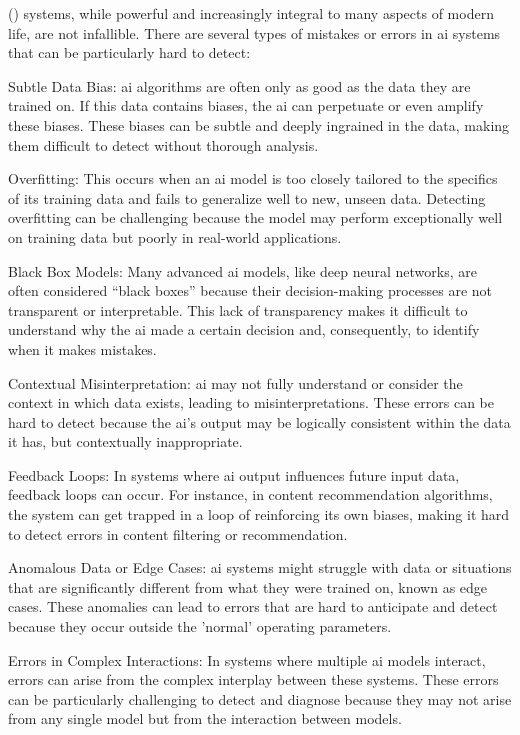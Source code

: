 \begin{aibox}
 () systems, while powerful and increasingly integral to many aspects of modern life, are not infallible. There are several types of mistakes or errors in \gls{ai} systems that can be particularly hard to detect:

Subtle Data Bias: \gls{ai} algorithms are often only as good as the data they are trained on. If this data contains biases, the \gls{ai} can perpetuate or even amplify these biases. These biases can be subtle and deeply ingrained in the data, making them difficult to detect without thorough analysis.

Overfitting: This occurs when an \gls{ai} model is too closely tailored to the specifics of its training data and fails to generalize well to new, unseen data. Detecting overfitting can be challenging because the model may perform exceptionally well on training data but poorly in real-world applications.

Black Box Models: Many advanced \gls{ai} models, like deep neural networks, are often considered ``black boxes'' because their decision-making processes are not transparent or interpretable. This lack of transparency makes it difficult to understand why the \gls{ai} made a certain decision and, consequently, to identify when it makes mistakes.

Contextual Misinterpretation: \gls{ai} may not fully understand or consider the context in which data exists, leading to misinterpretations. These errors can be hard to detect because the \gls{ai}'s output may be logically consistent within the data it has, but contextually inappropriate.

Feedback Loops: In systems where \gls{ai} output influences future input data, feedback loops can occur. For instance, in content recommendation algorithms, the system can get trapped in a loop of reinforcing its own biases, making it hard to detect errors in content filtering or recommendation.

Anomalous Data or Edge Cases: \gls{ai} systems might struggle with data or situations that are significantly different from what they were trained on, known as edge cases. These anomalies can lead to errors that are hard to anticipate and detect because they occur outside the 'normal' operating parameters.

Errors in Complex Interactions: In systems where multiple \gls{ai} models interact, errors can arise from the complex interplay between these systems. These errors can be particularly challenging to detect and diagnose because they may not arise from any single model but from the interaction between models.


\end{aibox}
